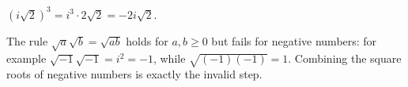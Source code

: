 $\left(i\sqrt2\right)^3=i^3\cdot2\sqrt2=\boxed{-2i\sqrt2}$.

The rule $\sqrt a\sqrt b=\sqrt{ab}$ holds for $a,b\ge0$ but fails for negative numbers: for example $\sqrt{-1}\sqrt{-1}=i^2=-1$, while $\sqrt{(-1)(-1)}=1$. Combining the square roots of negative numbers is exactly the invalid step.
